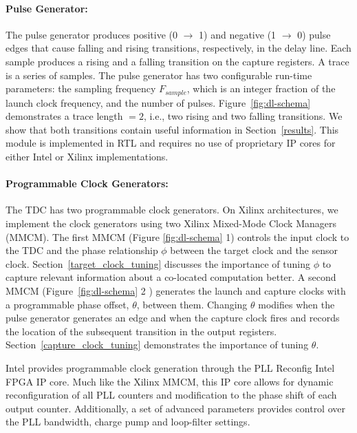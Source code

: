 \paragraph{Pulse Generator:}
The pulse generator produces positive (0 $\rightarrow$ 1) and negative (1 $\rightarrow$ 0) pulse edges that cause falling and rising transitions, respectively, in the delay line.
Each sample produces a rising and a falling transition on the capture registers. A trace is a series of samples.
The pulse generator has two configurable run-time parameters: the sampling frequency $F_{sample}$, which is an integer fraction of the launch clock frequency, and the number of pulses.
Figure~\ref{fig:dl-schema} demonstrates a trace length $=2$, i.e., two rising and two falling transitions. We show that both transitions contain useful information in Section~\ref{results}. This module is implemented in RTL and requires no use of proprietary IP cores for either Intel or Xilinx implementations.

\paragraph{Programmable Clock Generators: }
The \name TDC has two programmable clock generators. On Xilinx architectures, we implement the clock generators using two Xilinx Mixed-Mode Clock Managers (MMCM).
The first MMCM (Figure \ref{fig:dl-schema} \textcircled{\raisebox{-.9pt} {1}}) controls the input clock to the  TDC and the phase relationship $\phi$ between the target clock and the sensor clock. 
Section~\ref{target_clock_tuning} discusses the importance of tuning $\phi$ to capture relevant information about a co-located computation better. A second MMCM (Figure~\ref{fig:dl-schema} \textcircled{\raisebox{-.9pt} {2}} ) generates the launch and capture clocks with a programmable phase offset, $\theta$, between them.
Changing $\theta$ modifies when the pulse generator generates an edge and when the capture clock fires and records the location of the subsequent transition in the output registers. Section~\ref{capture_clock_tuning} demonstrates the importance of tuning $\theta$.

Intel provides programmable clock generation through the PLL Reconfig Intel FPGA IP core. Much like the Xilinx MMCM, this IP core allows for dynamic reconfiguration of all PLL counters and modification to the phase shift of each output counter. Additionally, a set of advanced parameters provides control over the PLL bandwidth, charge pump and loop-filter settings.

